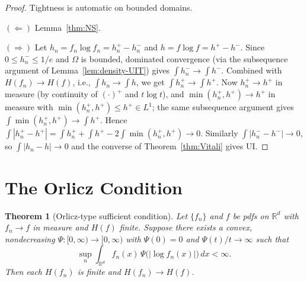 \documentclass[journal]{IEEEtran}
\newtheorem{theorem}{Theorem}
\theoremstyle{definition}
\theoremstyle{remark}
\newcommand{\Rd}{\mathbb{R}^d}
\newcommand{\1}{\mathbf{1}}
\newcommand{\Hent}{H}
\newcommand{\abs}[1]{\lvert #1 \rvert}
\newcommand{\dx}{\,dx}
\begin{document}
\begin{proof}
Tightness is automatic on bounded domains.

$(\Longleftarrow)$\;
Lemma~\ref{thm:NS}.

$(\Longrightarrow)$\;
Let $h_n = f_n \log f_n = h_n^+ - h_n^-$ and $h = f\log f =
h^+ - h^-$.  Since $0 \leq h_n^- \leq 1/e$ and $\Omega$ is
bounded, dominated convergence (via the subsequence argument of
Lemma~\ref{lem:density-UIT}) gives $\int h_n^- \to \int h^-$.
Combined with $\Hent(f_n) \to \Hent(f)$, i.e.,
$\int h_n \to \int h$, we get $\int h_n^+ \to \int h^+$.
Now $h_n^+ \to h^+$ in measure (by continuity of
$(\cdot)^+$ and $t\log t$), and
$\min(h_n^+, h^+) \to h^+$ in measure with
$\min(h_n^+, h^+) \leq h^+ \in L^1$; the same subsequence
argument gives $\int \min(h_n^+, h^+) \to \int h^+$.  Hence
$\int |h_n^+ - h^+| = \int h_n^+ + \int h^+ -
2\int\min(h_n^+, h^+) \to 0$.
Similarly $\int |h_n^- - h^-| \to 0$, so
$\int |h_n - h| \to 0$ and the converse of
Theorem~\ref{thm:Vitali} gives UI.
\end{proof}

\section{The Orlicz Condition}\label{sec:orlicz}

\begin{theorem}[Orlicz-type sufficient condition]\label{thm:orlicz}
Let $\{f_n\}$ and $f$ be pdfs on $\Rd$ with $f_n \to f$ in measure
and $\Hent(f)$ finite.  Suppose there exists a convex, nondecreasing
$\Psi : [0,\infty) \to [0,\infty)$ with $\Psi(0) = 0$ and
$\Psi(t)/t \to \infty$
such that
\begin{equation}\label{eq:Psi-bound}
  \sup_n \int_{\Rd} f_n(x)\, \Psi\!\bigl(\abs{\log f_n(x)}\bigr) \dx
  < \infty.
\end{equation}
Then each $\Hent(f_n)$ is finite and $\Hent(f_n) \to \Hent(f)$.
\end{theorem}
\end{document}
